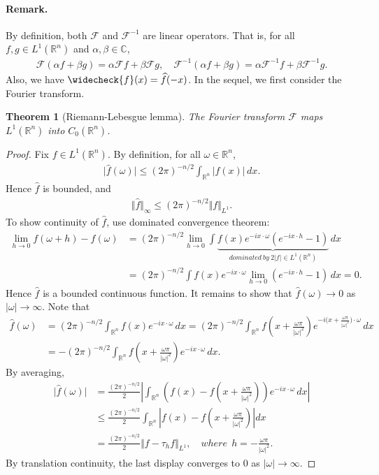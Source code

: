 \documentclass{article}
\numberwithin{equation}{section}
\newcommand{\bbC}{\mathbb{C}}
\newcommand{\bbR}{\mathbb{R}}
\renewcommand{\cal}{\mathcal}
\newcommand{\wh}{\widehat}
\theoremstyle{plain}
\newtheorem{theorem}{Theorem}[section]
\theoremstyle{definition}
\begin{document}
\paragraph{Remark.} By definition, both $\cal{F}$ and $\cal{F}^{-1}$ are linear operators. That is, for all $f,g\in L^1(\bbR^n)$ and $\alpha,\beta\in\bbC$,
\begin{align*}
	\cal{F}(\alpha f+\beta g)=\alpha \cal{F}f+\beta\cal{F}g,\quad \cal{F}^{-1}(\alpha f+\beta g)=\alpha \cal{F}^{-1}f+\beta\cal{F}^{-1}g.
\end{align*}
Also, we have $\widecheck{f}(x)=\wh{f}(-x)$. In the sequel, we first consider the Fourier transform.
\begin{theorem}[Riemann-Lebesgue lemma]
The Fourier transform $\cal{F}$ maps $L^1(\bbR^n)$ into $C_0(\bbR^n)$.
\end{theorem}
\begin{proof}
Fix $f\in L^1(\bbR^n)$. By definition, for all $\omega\in\bbR^n$,
\begin{align*}
	\vert\wh{f}(\omega)\vert\leq(2\pi)^{-n/2}\int_{\bbR^n}\vert f(x)\vert\,dx.
\end{align*}
Hence $\wh{f}$ is bounded, and
\begin{align}\label{blpoffourier}
	\Vert\wh{f}\Vert_\infty\leq(2\pi)^{-n/2}\Vert f\Vert_{L^1}.
\end{align}
To show continuity of $\wh{f}$, use dominated convergence theorem:
\begin{align*}
	\lim_{h\to 0}f(\omega+h)-f(\omega)&=(2\pi)^{-n/2}\lim_{h\to 0}\int \underbrace{f(x)e^{-i x\cdot\omega}\left(e^{-i x\cdot h}-1\right)}_{dominated\ by\ 2\vert f\vert\in L^1(\bbR^n)}\,dx\\
	&=(2\pi)^{-n/2}\int f(x)e^{-ix\cdot\omega}\lim_{h\to 0}\left(e^{-ix\cdot h}-1\right)\,dx =0.
\end{align*}
Hence $\wh{f}$ is a bounded continuous function. It remains to show that $\wh{f}(\omega)\to 0$ as $\vert\omega\vert\to\infty$. Note that
\begin{align*}
	\wh{f}(\omega)&=(2\pi)^{-n/2}\int_{\bbR^n}f(x)e^{-i x\cdot\omega}\,dx=(2\pi)^{-n/2}\int_{\bbR^n}f\left(x+\frac{\omega\pi}{\vert\omega\vert^2}\right)e^{-i\bigl(x+\frac{\omega\pi}{\vert\omega\vert^2}\bigr)\cdot\omega}\,dx\\
	&=-(2\pi)^{-n/2}\int_{\bbR^n}f\left(x+\frac{\omega\pi}{\vert\omega\vert^2}\right)e^{-i x\cdot\omega}\,dx.
\end{align*}
By averaging,
\begin{align*}
	\vert\wh{f}(\omega)\vert&=\frac{(2\pi)^{-n/2}}{2}\left\vert\int_{\bbR^n}\left( f(x)-f\left(x+\frac{\omega\pi}{\vert\omega\vert^2}\right)\right) e^{-i x\cdot\omega}\,dx\right\vert\\
	&\leq\frac{(2\pi)^{-n/2}}{2}\int_{\bbR^n}\left\vert f(x)-f\left(x+\frac{\omega\pi}{\vert\omega\vert^2}\right)\right\vert dx\\
	&=\frac{(2\pi)^{-n/2}}{2}\Vert f-\tau_hf\Vert_{L^1},\quad where\ \ h=-\frac{\omega\pi}{\vert\omega\vert^2}.
\end{align*}
By translation continuity, the last display converges to $0$ as $\vert\omega\vert\to\infty$.
\end{proof}
\end{document}
